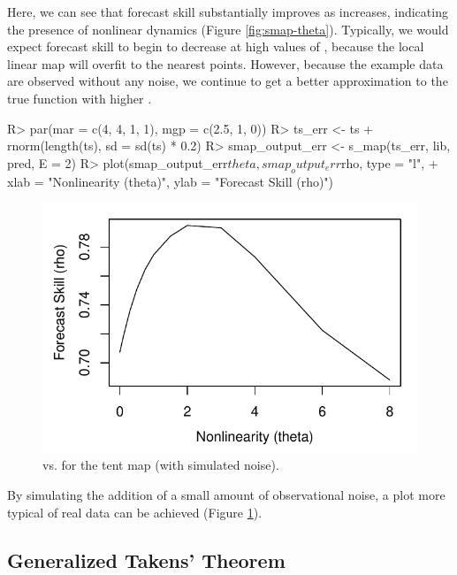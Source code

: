 \documentclass[article]{jss}
\begin{document}
Here, we can see that forecast skill substantially improves as  increases, indicating the presence of nonlinear dynamics (Figure \ref{fig:smap-theta}). Typically, we would expect forecast skill to begin to decrease at high values of , because the local linear map will overfit to the nearest points. However, because the example data are observed without any noise, we continue to get a better approximation to the true function with higher .

\begin{Schunk}
\begin{Sinput}
R> par(mar = c(4, 4, 1, 1), mgp = c(2.5, 1, 0))
R> ts_err <- ts + rnorm(length(ts), sd = sd(ts) * 0.2)
R> smap_output_err <- s_map(ts_err, lib, pred, E = 2)
R> plot(smap_output_err$theta, smap_output_err$rho, type = "l",
+       xlab = "Nonlinearity (theta)", ylab = "Forecast Skill (rho)")
\end{Sinput}
\end{Schunk}

\begin{figure}[t!]
\centering
\includegraphics[width=4.5in]{article-smap-theta-noisy}
\caption{\label{fig:smap-theta-noisy}  vs.  for the tent map (with simulated noise).}
\end{figure}

By simulating the addition of a small amount of observational noise, a plot more typical of real data can be achieved (Figure \ref{fig:smap-theta-noisy}).

\subsection{Generalized Takens' Theorem}\label{sec:generalized-takens-theorem}
\end{document}

